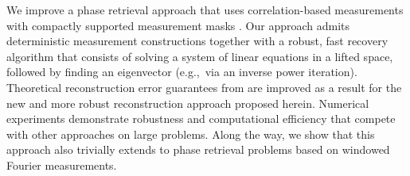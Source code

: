%
We improve a phase retrieval approach that uses correlation-based measurements with compactly supported measurement masks \cite{IVW2015_FastPhase}.  Our approach admits deterministic measurement constructions together with a robust, fast recovery algorithm that consists of solving a system of linear equations in a lifted space, followed by finding an eigenvector (e.g.,~via an inverse power iteration).  Theoretical reconstruction error guarantees from \cite{IVW2015_FastPhase} are improved as a result for the new and more robust reconstruction approach proposed herein.  Numerical experiments demonstrate robustness and computational efficiency that compete with other approaches on large problems.  Along the way, we show that this approach also trivially extends to phase retrieval problems based on windowed Fourier measurements.
